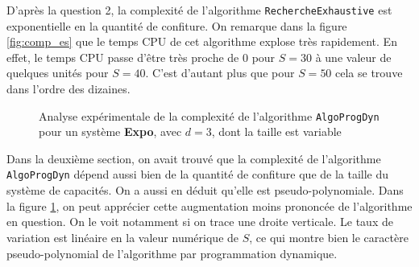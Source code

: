 \documentclass[12pt,a4paper]{article}
\begin{document}
D'apr\`es la question 2, la complexit\'e de l'algorithme \texttt{RechercheExhaustive} est exponentielle en la quantit\'e de confiture. On remarque dans la figure \ref{fig:comp_es} que le temps CPU de cet algorithme explose tr\`es rapidement. En effet, le temps CPU passe d'\^etre tr\`es proche de 0 pour $S=30$ \`a une valeur de quelques unit\'es pour $S=40$. C'est d'autant plus que pour $S=50$ cela se trouve dans l'ordre des dizaines. 

 \begin{figure}[!h]
  \centering
  \captionsetup{justification=centering}
  \caption[Analyse exp\'erimentale de \texttt{AlgoProgDyn}]{Analyse exp\'erimentale de la complexit\'e de l'algorithme \texttt{AlgoProgDyn} pour un syst\`eme {\bfseries Expo}, avec $d=3$, dont la taille est variable}
  \label{fig:comp_dp}
\end{figure}

\newpage

Dans la deuxi\`eme section, on avait trouv\'e que la complexit\'e de l'algorithme \texttt{AlgoProgDyn} d\'epend aussi bien de la quantit\'e de confiture que de la taille du syst\`eme de capacit\'es. On a aussi en d\'eduit qu'elle est pseudo-polynomiale. Dans la figure \ref{fig:comp_dp}, on peut appr\'ecier cette augmentation moins prononc\'ee de l'algorithme en question. On le voit notamment si on trace une droite verticale. Le taux de variation est lin\'eaire en la valeur num\'erique de $S$, ce qui montre bien le caract\`ere pseudo-polynomial de l'algorithme par programmation dynamique. 
\end{document}
